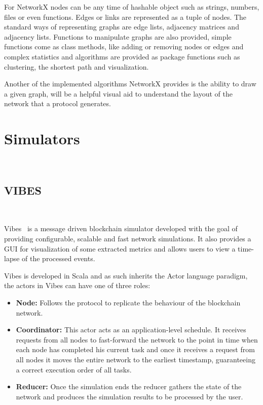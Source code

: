 For NetworkX nodes can be any time of hashable object such as strings, numbers,
files or even functions. Edges or links are represented as a tuple of nodes. The
standard ways of representing graphs are edge lists, adjacency matrices and adjacency
lists. Functions to manipulate graphs are also provided, simple functions come as class
methods, like adding or removing nodes or edges and complex statistics and algorithms
are provided as package functions such as clustering, the shortest path and visualization.

Another of the implemented algorithms NetworkX provides is the ability to draw
a given graph, will be a helpful visual aid to understand the layout of the network
that a protocol generates.

\section{Simulators}~\label{sec:simulators}
\subsection{VIBES}~\label{subsec:vibes}

Vibes~\cite{vibes} is a message driven blockchain simulator developed with the goal of providing
configurable, scalable and fast network simulations. It also provides a GUI for visualization
of some extracted metrics and allows users to view a time-lapse of the processed events.

Vibes is developed in Scala and as such inherits the Actor language paradigm, the actors in
Vibes can have one of three roles:

\begin{itemize}
  \item \textbf{Node:} Follows the protocol to replicate the behaviour of the blockchain
  network.
  \item \textbf{Coordinator:} This actor acts as an application-level schedule. It receives
  requests from all nodes to fast-forward the network to the point in time when each node
  has completed his current task and once it receives a request from all nodes it moves the
  entire network to the earliest timestamp, guaranteeing a correct execution order of all tasks.
  \item \textbf{Reducer:} Once the simulation ends the reducer gathers the state of the network
  and produces the simulation results to be processed by the user.
\end{itemize}

